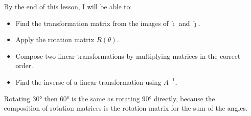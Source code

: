 \documentclass[10pt]{article}
\begin{document}
\namedateperiod

\vspace{0.08in}

\begin{objectivebox}
By the end of this lesson, I will be able to:
\begin{itemize}[leftmargin=1.5em, itemsep=3pt]
  \item Find the transformation matrix from the images of $\hat{\imath}$ and $\hat{\jmath}$.
  \item Apply the rotation matrix $R(\theta)$.
  \item Compose two linear transformations by multiplying matrices in the correct order.
  \item Find the inverse of a linear transformation using $A^{-1}$.
\end{itemize}
\end{objectivebox}

\vspace{0.06in}

\begin{vocabbox}





\end{vocabbox}

\vspace{0.06in}

\begin{hookbox}
Rotating $30°$ then $60°$ is the same as rotating $90°$ directly, because the composition of
rotation matrices is the rotation matrix for the sum of the angles.
\end{hookbox}
\end{document}
